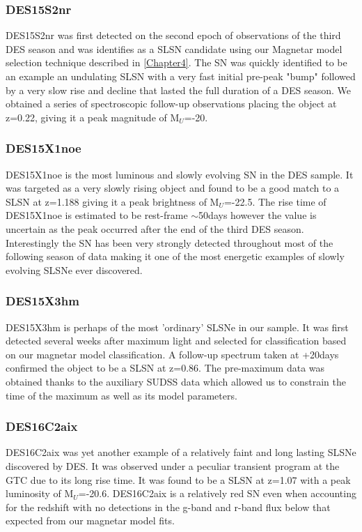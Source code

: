 \subsubsection{DES15S2nr}
DES15S2nr was first detected on the second epoch of observations of the third DES season and was identifies as a SLSN candidate using our Magnetar model selection technique described in \cref{Chapter4}. The SN was quickly identified to be an example an undulating SLSN with a very fast initial pre-peak "bump" followed by a very slow rise and decline that lasted the full duration of a DES season. We obtained a series of spectroscopic follow-up observations placing the object at z=0.22, giving it a peak magnitude of M$_U$=-20.     

\subsubsection{DES15X1noe}
DES15X1noe is the most luminous and slowly evolving SN in the DES sample. It was targeted as a very slowly rising object and found to be a good match to a SLSN at z=1.188 giving it a peak brightness of M$_U$=-22.5. The rise time of DES15X1noe is estimated to be rest-frame $\sim$50days however the value is uncertain as the peak occurred after the end of the third DES season. Interestingly the SN has been very strongly detected throughout most of the following season of data making it one of the most energetic examples of slowly evolving SLSNe ever discovered.

\subsubsection{DES15X3hm}
DES15X3hm is perhaps of the most 'ordinary' SLSNe in our sample. It was first detected several weeks after maximum light and selected for classification based on our magnetar model classification. A follow-up spectrum taken at +20days confirmed the object to be a SLSN at z=0.86. The pre-maximum data was obtained thanks to the auxiliary SUDSS data which allowed us to constrain the time of the maximum as well as its model parameters.

\subsubsection{DES16C2aix}
DES16C2aix was yet another example of a relatively faint and long lasting SLSNe discovered by DES. It was observed under a peculiar transient program at the GTC due to its long rise time. It was found to be a SLSN at z=1.07 with a peak luminosity of M$_U$=-20.6. DES16C2aix is a relatively red SN even when accounting for the redshift with no detections in the g-band and 
r-band flux below that expected from our magnetar model fits. 

